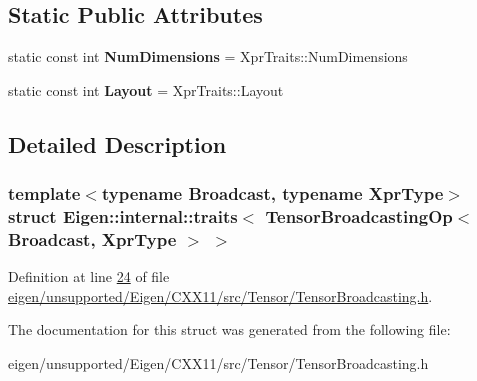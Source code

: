 \subsection*{Static Public Attributes}
\begin{DoxyCompactItemize}
\item 
\mbox{\label{struct_eigen_1_1internal_1_1traits_3_01_tensor_broadcasting_op_3_01_broadcast_00_01_xpr_type_01_4_01_4_a7b1a725a16725174f7c6985e57c2ee57}} 
static const int {\bfseries Num\+Dimensions} = Xpr\+Traits\+::\+Num\+Dimensions
\item 
\mbox{\label{struct_eigen_1_1internal_1_1traits_3_01_tensor_broadcasting_op_3_01_broadcast_00_01_xpr_type_01_4_01_4_a343142e2b7ba79605b66311a04120255}} 
static const int {\bfseries Layout} = Xpr\+Traits\+::\+Layout
\end{DoxyCompactItemize}


\subsection{Detailed Description}
\subsubsection*{template$<$typename Broadcast, typename Xpr\+Type$>$\newline
struct Eigen\+::internal\+::traits$<$ Tensor\+Broadcasting\+Op$<$ Broadcast, Xpr\+Type $>$ $>$}



Definition at line \hyperlink{eigen_2unsupported_2_eigen_2_c_x_x11_2src_2_tensor_2_tensor_broadcasting_8h_source_l00024}{24} of file \hyperlink{eigen_2unsupported_2_eigen_2_c_x_x11_2src_2_tensor_2_tensor_broadcasting_8h_source}{eigen/unsupported/\+Eigen/\+C\+X\+X11/src/\+Tensor/\+Tensor\+Broadcasting.\+h}.



The documentation for this struct was generated from the following file\+:\begin{DoxyCompactItemize}
\item 
eigen/unsupported/\+Eigen/\+C\+X\+X11/src/\+Tensor/\+Tensor\+Broadcasting.\+h\end{DoxyCompactItemize}
